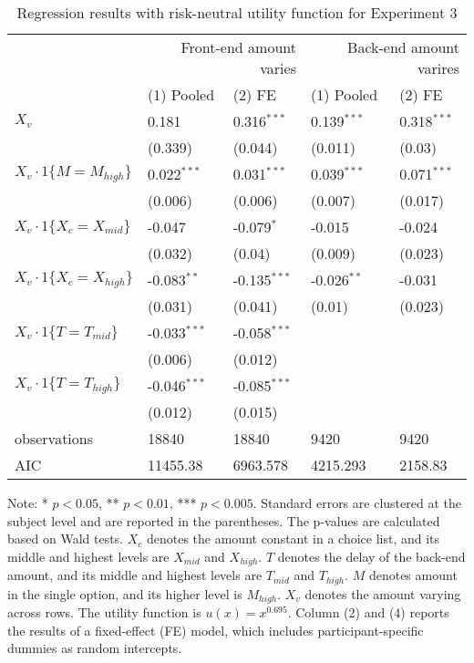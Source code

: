 \documentclass[12pt]{article}
\begin{document}
\begin{table}
    \caption{Regression results with risk-neutral utility function for Experiment 3}
    \vspace*{12pt}
    \centering

      \begin{tabular}{lllll}
\hline
 & \multicolumn{2}{r}{Front-end amount varies} & \multicolumn{2}{r}{Back-end amount varires} \\
 & (1) Pooled & (2) FE & (1) Pooled & (2) FE \\
\hline
$X_v$ & 0.181 & 0.316$^{***}$ & 0.139$^{***}$ & 0.318$^{***}$ \\
 & (0.339) & (0.044) & (0.011) & (0.03) \\
$X_v\cdot1\{M=M_{high}\}$ & 0.022$^{***}$ & 0.031$^{***}$ & 0.039$^{***}$ & 0.071$^{***}$ \\
 & (0.006) & (0.006) & (0.007) & (0.017) \\
$X_v\cdot1\{X_c=X_{mid}\}$ & -0.047 & -0.079$^{*}$ & -0.015 & -0.024 \\
 & (0.032) & (0.04) & (0.009) & (0.023) \\
$X_v\cdot1\{X_c=X_{high}\}$ & -0.083$^{**}$ & -0.135$^{***}$ & -0.026$^{**}$ & -0.031 \\
 & (0.031) & (0.041) & (0.01) & (0.023) \\
$X_v\cdot1\{T=T_{mid}\}$ & -0.033$^{***}$ & -0.058$^{***}$ &  &  \\
 & (0.006) & (0.012) &  &  \\
$X_v\cdot1\{T=T_{high}\}$ & -0.046$^{***}$ & -0.085$^{***}$ &  &  \\
 & (0.012) & (0.015) &  &  \\\hline

observations & 18840 & 18840 & 9420 & 9420 \\
AIC & 11455.38 & 6963.578 & 4215.293 & 2158.83 \\
\hline
\end{tabular}

    \vspace*{4pt}
    \centering
    \begin{minipage}{0.85\textwidth}
    {\par\footnotesize Note: * $p<0.05$, ** $p<0.01$, *** $p<0.005$. Standard errors are clustered at the subject level and are reported in the parentheses. The p-values are calculated based on Wald tests. $X_c$ denotes the amount constant in a choice list, and its middle and highest levels are $X_{mid}$ and $X_{high}$. $T$ denotes the delay of the back-end amount, and its middle and highest levels are $T_{mid}$ and $T_{high}$. $M$ denotes amount in the single option, and its higher level is $M_{high}$. $X_v$ denotes the amount varying across rows. The utility function is $u(x)=x^{0.695}$. Column (2) and (4) reports the results of a fixed-effect (FE) model, which includes participant-specific dummies as random intercepts.}
    \end{minipage}
    \label{tab:exp1_reg_baseline}
\end{table}
\end{document}
